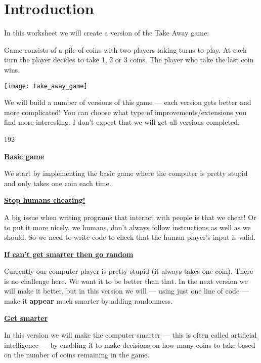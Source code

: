 \documentclass{coderdojo}
\begin{document}
\maketitle

\section*{Introduction}

In this worksheet we will create a version of the Take Away game:
\begin{exercise}
Game consists of a pile of coins with two players taking turns to play. At each turn the player decides to take 1, 2 or 3 coins.  The player who take the last coin wins.

\centerline {\texttt{[image: take\_away\_game]}}
\end{exercise}

We will build a number of versions of this game --- each version gets better and more complicated! You can choose what type of improvements/extensions you find more interesting. I don't expect that we will get all versions completed.

\begin{dingautolist}{192}
\item \hyperref[sec:basic]{\color{section}\bfseries Basic game}

We start by implementing the basic game where the computer is pretty stupid and only takes one coin each time.

\item \hyperref[sec:StopHumans]{\color{section}\bfseries Stop humans cheating!}

A big issue when writing programs that interact with people is that we cheat! Or to put it more nicely, we humans, don't always follow instructions as well as we should.  So we need to write code to check that the human player's input is valid. 

\item \hyperref[sec:GoRandom]{\color{section}\bfseries If can't get smarter then go random}

Currently our computer player is pretty stupid (it always takes one coin).  There is no challenge here. We want it to be better than that. In the next version we will make it better, but in this version we will --- using just one line of code --- make it {\bfseries appear} much smarter by adding randomness. 

\item \hyperref[sec:GetSmarter]{\color{section}\bfseries Get smarter}

In this version we will make the computer smarter --- this is often called artificial intelligence --- by enabling it to make decisions on how many coins to take based on the number of coins remaining in the game.

\end{dingautolist}
\end{document}
